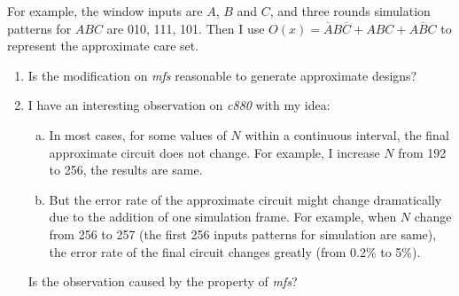 \documentclass{rpt}
\begin{document}
For example, the window inputs are $A$, $B$ and $C$, and three rounds simulation patterns for $ABC$ are 010, 111, 101.
Then I use $O(x) = \overline AB \overline C + ABC + A \overline B C$ to represent the approximate care set.

\begin{enumerate}
\item Is the modification on \textit{mfs} reasonable to generate approximate designs?
\item I have an interesting observation on \textit{c880} with my idea:

\begin{enumerate}[(a)]
\item
In most cases, for some values of $N$ within a continuous interval,
the final approximate circuit does not change.
For example,
I increase $N$ from 192 to 256, the results are same.

\item
But the error rate of the approximate circuit might change dramatically due to the addition of one simulation frame.
For example, when $N$ change from 256 to 257 (the first 256 inputs patterns for simulation are same), the error rate of the final circuit changes greatly (from 0.2\% to 5\%).
\end{enumerate}

Is the observation caused by the property of \textit{mfs}?
\end{enumerate}
\end{document}
